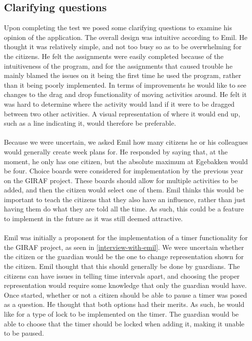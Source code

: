 \subsection{Clarifying questions}
Upon completing the test we posed some clarifying questions to examine his opinion of the application.
The overall design was intuitive according to Emil. He thought it was relatively simple, and not too busy so as to be overwhelming for the citizens.
He felt the assignments were easily completed because of the intuitiveness of the program, and for the assignments that caused trouble he mainly blamed the issues on it being the first time he used the program, rather than it being poorly implemented.
In terms of improvements he would like to see changes to the drag and drop functionality of moving activities around.
He felt it was hard to determine where the activity would land if it were to be dragged between two other activities.
A visual representation of where it would end up, such as a line indicating it, would therefore be preferable.
\\\\
Because we were uncertain, we asked Emil how many citizens he or his colleagues would generally create week plans for.
He responded by saying that, at the moment, he only has one citizen, but the absolute maximum at Egebakken would be four.
Choice boards were considered for implementation by the previous year on the GIRAF project.
These boards should allow for multiple activities to be added, and then the citizen would select one of them.
Emil thinks this would be important to teach the citizens that they also have an influence, rather than just having them do what they are told all the time.
As such, this could be a feature to implement in the future as it was still deemed attractive.
\\\\
Emil was initially a proponent for the implementation of a timer functionality for the GIRAF project, as seen in \autoref{interview-with-emil}.
We were uncertain whether the citizen or the guardian would be the one to change representation shown for the citizen.
Emil thought that this should generally be done by guardians.
The citizens can have issues in telling time intervals apart, and choosing the proper representation would require some knowledge that only the guardian would have.
Once started, whether or not a citizen should be able to pause a timer was posed as a question.
He thought that both options had their merits. 
As such, he would like for a type of lock to be implemented on the timer.
The guardian would be able to choose that the timer should be locked when adding it, making it unable to be paused.

